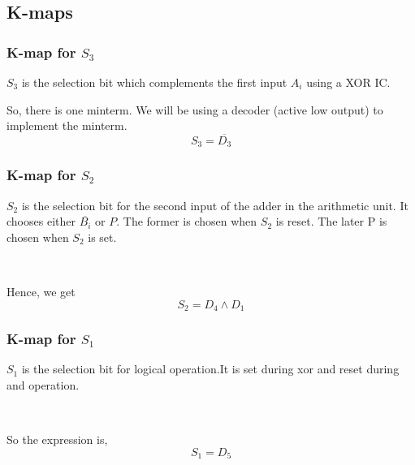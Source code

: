 \documentclass[18pt]{article}
\begin{document}
\subsection{K-maps}

\large
\subsubsection{K-map for $S_{3}$}
$S_{3}$ is the selection bit which complements the first input $A_{i}$ using a XOR IC.\par

\begin{figure}[!h]
    \centering
    \begin{Karnaughvuit}
    \end{Karnaughvuit}
\end{figure}
\raggedright
So, there is one minterm. We will be using a decoder (active low output) to implement the minterm.$$S_{3} = \overline{D_{3}}$$

\subsubsection{K-map for $S_{2}$}
$S_{2}$ is the selection bit for the second input of the adder in the arithmetic unit. It chooses either $\overline{B_{i}}$ or $P$. The former is chosen when $S_{2}$ is reset. The later P is chosen when $S_{2}$ is set.
\begin{figure}[!h]
\end{figure}\\
\raggedright
Hence, we get $$S_{2} = D_{4} \land D_{1}$$

\subsubsection{K-map for $S_{1}$}
$S_{1}$ is the selection bit for logical operation.It is set during xor and reset during and operation.
\begin{figure}[!h]
\end{figure}\\
\raggedright
So the expression is, $$S_{1} = D_{5}$$
\end{document}
